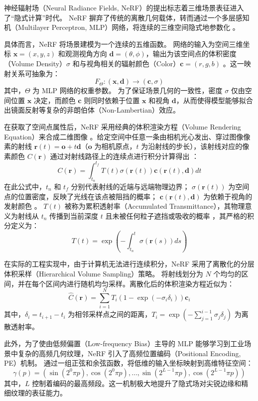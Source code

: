 神经辐射场（Neural Radiance Fields, NeRF）的提出标志着三维场景表征进入了“隐式计算”时代。
NeRF 摒弃了传统的离散几何载体，转而通过一个多层感知机（Multilayer Perceptron, MLP）网络，将连续的三维空间隐式地参数化 。

具体而言，NeRF 将场景建模为一个连续的五维函数。
网络的输入为空间三维坐标 $\bm{x} = (x, y, z)$ 和观测视角方向 $\bm{d} = (\theta, \phi)$，输出为该空间点的体积密度（Volume Density）$\sigma$ 和与视角相关的辐射颜色（Color）$\bm{c} = (r, g, b)$ 。这一映射关系可抽象为：
\begin{equation}
    F_{\Theta}: (\bm{x}, \bm{d}) \to (\bm{c}, \sigma)
\end{equation}
其中，$\Theta$ 为 MLP 网络的权重参数。
为了保证场景几何的一致性，密度 $\sigma$ 仅由空间位置 $\bm{x}$ 决定，而颜色 $\bm{c}$ 则同时依赖于位置 $\bm{x}$ 和视角 $\bm{d}$，从而使得模型能够拟合出镜面反射等复杂的非朗伯体（Non-Lambertian）效应。

在获取了空间点属性后，NeRF 采用经典的体积渲染方程（Volume Rendering Equation）来合成二维图像 。给定空间中任意一条由相机光心发出、穿过图像像素的射线 $\bm{r}(t) = \bm{o} + t\bm{d}$（$\bm{o}$ 为相机原点，$t$ 为沿射线的步长），该射线对应的像素颜色 $C(\bm{r})$ 通过对射线路径上的连续点进行积分计算得出 ：
\begin{equation}
    C(\bm{r}) = \int_{t_n}^{t_f} T(t) \sigma(\bm{r}(t)) \bm{c}(\bm{r}(t), \bm{d}) dt
\end{equation}
在此公式中，$t_n$ 和 $t_f$ 分别代表射线的近端与远端物理边界；
$\sigma(\bm{r}(t))$ 为空间点的位置密度，反映了光线在该点被阻挡的概率；
$\bm{c}(\bm{r}(t), \bm{d})$ 为依赖于视角的发射颜色 。
$T(t)$ 被称为累积透射率（Accumulated Transmittance），其物理意义为射线从 $t_n$ 传播到当前深度 $t$ 且未被任何粒子遮挡或吸收的概率 ，其严格的积分定义为：
\begin{equation}
    T(t) = \exp\left(-\int_{t_n}^{t} \sigma(\bm{r}(s)) ds\right)
\end{equation}

在实际的工程实现中，由于计算机无法进行连续积分，NeRF 采用了离散化的分层体积采样（Hierarchical Volume Sampling）策略。
将射线划分为 $N$ 个均匀的区间，并在每个区间内进行随机均匀采样。离散化后的体积渲染方程近似为：
\begin{equation}
    \hat{C}(\bm{r}) = \sum_{i=1}^{N} T_i (1 - \exp(-\sigma_i \delta_i)) \bm{c}_i
\end{equation}
其中，$\delta_i = t_{i+1} - t_i$ 为相邻采样点之间的距离，$T_i = \exp(-\sum_{j=1}^{i-1} \sigma_j \delta_j)$ 为离散透射率。

此外，为了使由低频偏置（Low-frequency Bias）主导的 MLP 能够学习到工业场景中复杂的高频几何纹理，NeRF 引入了高频位置编码（Positional Encoding, PE）机制。
通过一组正弦和余弦函数，将低维的输入坐标映射到高维特征空间：
\begin{equation}
    \gamma(p) = \left( \sin(2^0 \pi p), \cos(2^0 \pi p), \dots, \sin(2^{L-1} \pi p), \cos(2^{L-1} \pi p) \right)
\end{equation}
其中，$L$ 控制着编码的最高频段。这一机制极大地提升了隐式场对尖锐边缘和精细纹理的表征能力。

